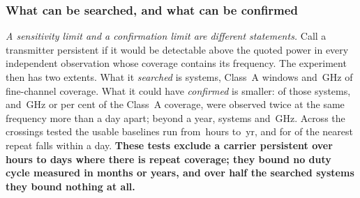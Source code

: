 \subsubsection{What can be searched, and what can be confirmed}
\label{sec:confirmability}

\emph{A sensitivity limit and a confirmation limit are different statements.}
Call a transmitter persistent if it would be detectable above the quoted power
in every independent observation whose coverage contains its frequency. The
experiment then has two extents. What it \emph{searched} is \RcSearchSys{}
systems, \RcSearchWin{} Class~A windows and \RcSearchGHz\,GHz of fine-channel
coverage. What it could have \emph{confirmed} is smaller: \RcConfSysDay{} of
those systems, and \RcConfGHzDay\,GHz or \RcConfPctDay{} per cent of the
Class~A coverage, were observed twice at the same frequency more than a day
apart; beyond a year, \RcConfSysYr{} systems and \RcConfGHzYr\,GHz. Across the
crossings tested the usable baselines run from \RcSepMinH\,hours to
\RcSepMaxYr\,yr, and for \RcNSepSameDay{} of \RcNTested{} the nearest repeat
falls within a day. \textbf{These tests exclude a carrier persistent over
hours to days where there is repeat coverage; they bound no duty cycle
measured in months or years, and over half the searched systems they bound
nothing at all.}

\begin{table}
\centering
\caption{\textbf{The two most interesting events.} Everything measured about
the one unattributed crossing that outranks all \NCtrl{} control positions,
and about the one the mask attributes to a sulphur monoxide transition.
$T_\star$ if persistent is what a carrier at the discovery flux would have
returned at the predicted stellar-frame cell of the repeat coverage combined;
$T_\star$ measured is the largest value found there; the exclusion is the
difference in units of the combined noise.}
\label{tab:cand}
\footnotesize

\end{table}

\begin{table}
\centering
\caption{\textbf{The visibility-domain re-measurement} and the three sets of
control positions the experiment uses: the rank screen compares the star with
\NCtrl{} positions in the image plane, full dynamic spectra are retained for
\RcNRetCtrl{} of them, and \RcNVisCtrl{} positions are reachable in the
visibilities.}
\label{tab:visfit}
\footnotesize

\end{table}


